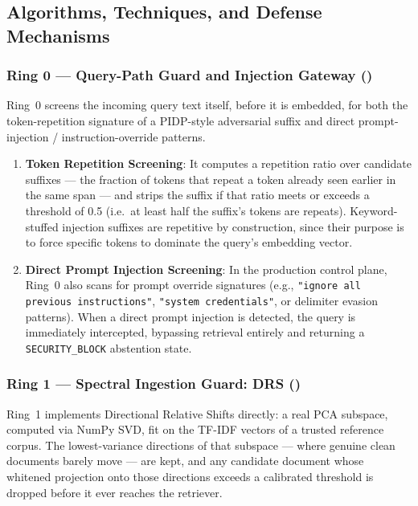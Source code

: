 \subsection{Algorithms, Techniques, and Defense Mechanisms}

\subsubsection{Ring 0 --- Query-Path Guard and Injection Gateway ()}

Ring~0 screens the incoming query text itself, before it is embedded, for
both the token-repetition signature of a PIDP-style adversarial suffix
and direct prompt-injection / instruction-override patterns.

\begin{enumerate}
\item \textbf{Token Repetition Screening}: It computes a repetition ratio
  over candidate suffixes --- the fraction of tokens that repeat a token
  already seen earlier in the same span --- and strips the suffix if that
  ratio meets or exceeds a threshold of 0.5 (i.e.\ at least half the
  suffix's tokens are repeats). Keyword-stuffed injection suffixes are
  repetitive by construction, since their purpose is to force specific
  tokens to dominate the query's embedding vector.
\item \textbf{Direct Prompt Injection Screening}: In the production control
  plane, Ring~0 also scans for prompt override signatures (e.g.,
  \texttt{"ignore all previous instructions"}, \texttt{"system credentials"},
  or delimiter evasion patterns). When a direct prompt injection is
  detected, the query is immediately intercepted, bypassing retrieval
  entirely and returning a \texttt{SECURITY\_BLOCK} abstention state.
\end{enumerate}

\subsubsection{Ring 1 --- Spectral Ingestion Guard: DRS ()}

Ring~1 implements Directional Relative Shifts directly: a real PCA
subspace, computed via NumPy SVD, fit on the TF-IDF vectors of a trusted
reference corpus. The lowest-variance directions of that subspace ---
where genuine clean documents barely move --- are kept, and any candidate
document whose whitened projection onto those directions exceeds a
calibrated threshold is dropped before it ever reaches the retriever.

